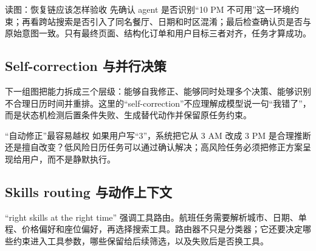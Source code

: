 



\begin{knowledgebox}{读图：恢复链应该怎样验收}
先确认 agent 是否识别“10 PM 不可用”这一环境约束；再看跨站搜索是否引入了同名餐厅、日期和时区混淆；最后检查确认页是否与原始意图一致。只有最终页面、结构化订单和用户目标三者对齐，任务才算成功。
\end{knowledgebox}

\subsection{Self-correction 与并行决策}

下一组图把能力拆成三个层级：能够自我修正、能够同时处理多个决策、能够识别不合理日历时间并重排。这里的“self-correction”不应理解成模型说一句“我错了”，而是状态机检测后置条件失败、生成替代动作并保留原任务约束。





\begin{warningbox}{“自动修正”最容易越权}
如果用户写“3”，系统把它从 3 AM 改成 3 PM 是合理推断还是擅自改变？低风险日历任务可以通过确认解决；高风险任务必须把修正方案呈现给用户，而不是静默执行。
\end{warningbox}

\subsection{Skills routing 与动作上下文}

“right skills at the right time” 强调工具路由。航班任务需要解析城市、日期、单程、价格偏好和座位偏好，再选择搜索工具。路由器不只是分类器；它还要决定哪些约束进入工具参数，哪些保留给后续筛选，以及失败后是否换工具。

